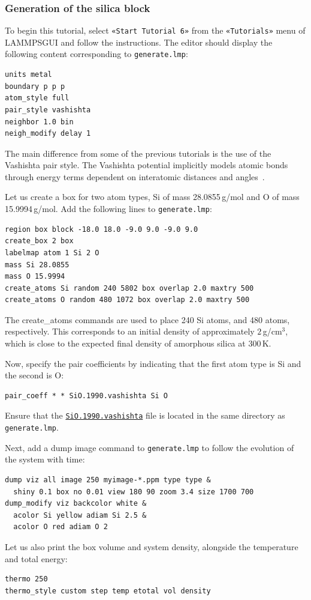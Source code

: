 \documentclass[9pt,tutorial]{livecoms}
\newcommand{\lmpcmd}[1]{\hspace{0pt}\colorbox{listing}{\textcolor{command}{\small{#1}}}\hspace{0pt}} %
\newcommand{\flecmd}[1]{\textcolor{command}{\texttt{#1}}} %
\newcommand{\guicmd}[1]{\textcolor{command}{\texttt{«#1»}}} %
\newcommand{\dwlcmd}[1]{\textcolor{download}{\texttt{#1}}} %
\newcommand{\lammpsgui}{\textsf{LAMMPS\textendash GUI}}
\newcommand{\filepath}{https://raw.githubusercontent.com/lammpstutorials/lammpstutorials-article/main/files/}
\begin{document}
\subsubsection{Generation of the silica block}

\noindent To begin this tutorial, select \guicmd{Start Tutorial 6} from the
\guicmd{Tutorials} menu of \lammpsgui{} and follow the instructions.
The editor should display the following content corresponding to \flecmd{generate.lmp}:
\begin{lstlisting}
units metal
boundary p p p
atom_style full
pair_style vashishta
neighbor 1.0 bin
neigh_modify delay 1
\end{lstlisting}
The main difference from some of the previous tutorials is the use of the \lmpcmd{Vashishta}
pair style.  The Vashishta potential implicitly models atomic bonds through
energy terms dependent on interatomic distances and angles~\cite{vashishta1990interaction}.

Let us create a box for two atom types, \lmpcmd{Si}
of mass 28.0855\,g/mol and \lmpcmd{O} of mass 15.9994\,g/mol.
Add the following lines to \flecmd{generate.lmp}:
\begin{lstlisting}
region box block -18.0 18.0 -9.0 9.0 -9.0 9.0
create_box 2 box
labelmap atom 1 Si 2 O
mass Si 28.0855
mass O 15.9994
create_atoms Si random 240 5802 box overlap 2.0 maxtry 500
create_atoms O random 480 1072 box overlap 2.0 maxtry 500
\end{lstlisting}
The \lmpcmd{create\_atoms} commands are used to place
240 Si atoms, and 480 atoms, respectively.  This corresponds to
an initial density of approximately $2$\,g/cm$^3$, which is close
to the expected final density of amorphous silica at 300\,K.

Now, specify the pair coefficients by indicating that the first atom type
is \lmpcmd{Si} and the second is \lmpcmd{O}:
\begin{lstlisting}
pair_coeff * * SiO.1990.vashishta Si O
\end{lstlisting}
Ensure that the \href{\filepath tutorial6/SiO.1990.vashishta}{\dwlcmd{SiO.1990.vashishta}}
file is located in the same directory as \flecmd{generate.lmp}.

Next, add a \lmpcmd{dump image} command to \flecmd{generate.lmp} to follow the
evolution of the system with time:
\begin{lstlisting}
dump viz all image 250 myimage-*.ppm type type &
  shiny 0.1 box no 0.01 view 180 90 zoom 3.4 size 1700 700
dump_modify viz backcolor white &
  acolor Si yellow adiam Si 2.5 &
  acolor O red adiam O 2
\end{lstlisting}
Let us also print the box volume and system density, alongside the
temperature and total energy:
\begin{lstlisting}
thermo 250
thermo_style custom step temp etotal vol density
\end{lstlisting}
\end{document}
